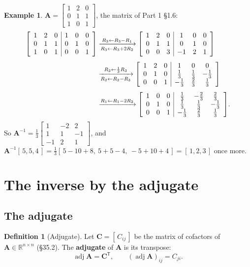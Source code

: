 \documentclass[11pt]{article}
\theoremstyle{plain}
\theoremstyle{definition}
\newtheorem{defn}{Definition}[section]
\newtheorem{ex}{Example}[section]
\theoremstyle{remark}
\newcommand{\R}{\mathbb{R}}
\newcommand{\mt}[1]{\mathbf{#1}}
\newcommand{\T}{^{\mathsf{T}}}
\DeclareMathOperator{\adj}{adj}
\newenvironment{aug}[1]{\left[\begin{array}{#1}}{\end{array}\right]}
\begin{document}
\begin{ex}
\label{ex:gjinv}
$\mt{A}=\begin{bmatrix}1&2&0\\0&1&1\\1&0&1\end{bmatrix}$, the matrix of Part 1
\S1.6:
\[
  \begin{aligned}
  \begin{aug}{ccc|ccc}1&2&0&1&0&0\\0&1&1&0&1&0\\1&0&1&0&0&1\end{aug}
  &\xrightarrow[R_3\gets R_3+2R_2]{R_3\gets R_3-R_1}
  \begin{aug}{ccc|ccc}1&2&0&1&0&0\\0&1&1&0&1&0\\0&0&3&-1&2&1\end{aug}\\[4pt]
  &\xrightarrow[R_2\gets R_2-R_3]{R_3\gets\frac13R_3}
  \begin{aug}{ccc|ccc}1&2&0&1&0&0\\0&1&0&\frac13&\frac13&-\frac13\\0&0&1&-\frac13&\frac23&\frac13\end{aug}\\[4pt]
  &\xrightarrow{R_1\gets R_1-2R_2}
  \begin{aug}{ccc|ccc}1&0&0&\frac13&-\frac23&\frac23\\0&1&0&\frac13&\frac13&-\frac13\\0&0&1&-\frac13&\frac23&\frac13\end{aug}.
  \end{aligned}
\]
So $\mt{A}^{-1}=\frac13\begin{bmatrix}1&-2&2\\1&1&-1\\-1&2&1\end{bmatrix}$, and
$\mt{A}^{-1}[\,5,5,4\,]=\frac13[\,5-10+8,\ 5+5-4,\ -5+10+4\,]=[\,1,2,3\,]$ once
more.
\end{ex}

\section{The inverse by the adjugate}

\subsection{The adjugate}
\begin{defn}[Adjugate]
Let $\mt{C}=[\,C_{ij}\,]$ be the matrix of cofactors of $\mt{A}\in\R^{n\times n}$
(\S35.2). The \textbf{adjugate} of $\mt{A}$ is its transpose:
\[
  \adj\mt{A}=\mt{C}\T,\qquad (\adj\mt{A})_{ij}=C_{ji}.
\]
\end{defn}
\end{document}
